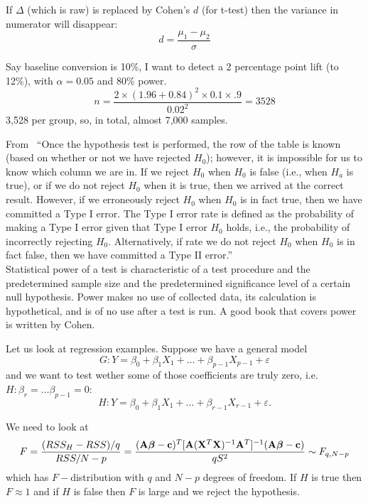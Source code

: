 If $\Delta$ (which is raw) is replaced by Cohen's $d$ (for t-test) then the
variance in numerator will disappear:
\[d = \frac{\mu_1 - \mu_2}{\sigma}\]


\begin{exm}
Say baseline conversion is 10\%, I want to detect a 2 percentage point lift (to 12\%), with $\alpha = 0.05$ and 
80\% power.
\[
n = \frac{2 \times (1.96 + 0.84)^2 \times 0.1 \times .9}{0.02^2} = 3528
\]
3,528 per group, so, in total, almost 7,000 samples.
\end{exm}


From~\citep{james2013introduction} ``Once the hypothesis test is performed, the row of the
table is known (based on whether or not we have rejected $H_0$); 
however, it is impossible for us to know which column we are in. 
If we reject $H_0$ when $H_0$ is false (i.e., when $H_a$ is true), 
or if we do not reject $H_0$ when it is true, then we arrived at the correct result. 
However, if we erroneously reject $H_0$ when $H_0$ is in fact true, then we have committed a Type I error. 
The Type I error rate is defined as the probability of making a Type I error given that Type I error $H_0$ holds, i.e., the probability of incorrectly rejecting $H_0$. 
Alternatively, if rate we do not reject $H_0$ when $H_0$ is in fact false, then we have committed a
Type II error.''\\

Statistical power of a test is characteristic of a test procedure and 
the predetermined sample size and the predetermined significance level
of a certain null hypothesis. Power makes no use of collected data,
its calculation is hypothetical, and is of no use after a test is run\cite{georgiev2019}.
A good book that covers power is written by Cohen\cite{cohen2013statistical}.


Let us look at regression examples.
Suppose we have a general model
\[G: Y=\beta_0 + \beta_1 X_1 + \dots +\beta_{p-1}X_{p-1}+\varepsilon\]
and we want to test wether some of those coefficients are truly zero,
i.e. $H: \beta_r = \dots \beta_{p-1}=0$:
\[H: Y=\beta_0 + \beta_1 X_1 + \dots +\beta_{r-1}X_{r-1}+\varepsilon.\]

\noindent We need to look at 
\[
F=\frac{(RSS_H-RSS)/q}{RSS/N-p}
 = \frac{({\bf A \boldsymbol \beta - \bf c})^T [{\bf A} ({\bf X}^T{\bf X})^{-1}{\bf A}^T]^{-1} (\bf A \boldsymbol \beta - \bf c)}{qS^2}
 \sim F_{q, N-p}
\]
which has $F-$distribution with $q$ and $N-p$ degrees of freedom.
If $H$ is true then $F\approx 1$ and if $H$ is false then $F$ is large
and we reject the hypothesis.

